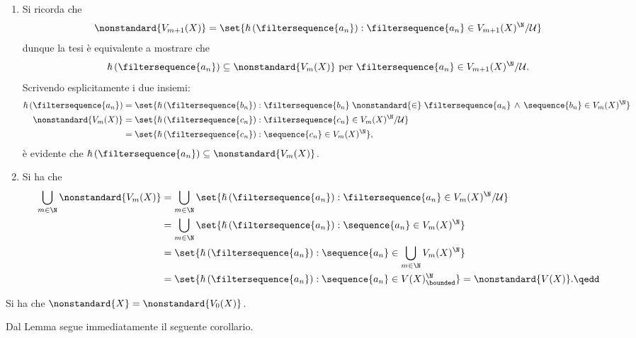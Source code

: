 {\begin{enumerate}
        \item Si ricorda che \begin{equation*}
            \nonstandard{V_{m+1}(X) } = \set{\hslash\left(\filtersequence{a_{n}}\right) : \filtersequence{a_{n}} \in V_{m+1}(X)^{\N}/\mathcal{U} }
        \end{equation*}dunque la tesi è equivalente a mostrare che \[\hslash\left(\filtersequence{a_{n}}\right) \subseteq \nonstandard{V_{m}(X) }\text{ per }\filtersequence{a_{n}} \in V_{m+1}(X)^{\N}/\mathcal{U}.\]Scrivendo esplicitamente i due insiemi:\begin{align*}
            \hslash\left(\filtersequence{a_{n}}\right) &= \set{\hslash \left(\filtersequence{b_{n}}\right): \filtersequence{b_{n}} \mathrel{\nonstandard{\in}}\filtersequence{a_{n}} \,\land\, \sequence{b_{n} } \in V_{m}(X)^{\N} }\\ 
            \nonstandard{V_{m}(X) } &= \set{\hslash\left(\filtersequence{c_{n}}\right): \filtersequence{c_{n}} \in V_{m}(X)^{\N}/\mathcal{U} }\\ 
            &=\set{\hslash\left(\filtersequence{c_{n}}\right): \sequence{c_{n} } \in V_{m}(X)^{\N} },
        \end{align*}è evidente che $ \hslash\left(\filtersequence{a_{n}}\right) \subseteq \nonstandard{V_{m}(X) } $.
        \item Si ha che \begin{align*}
            \bigcup_{m \in \N} \nonstandard{V_{m}(X) } &= \bigcup_{m \in \N} \set{\hslash\left(\filtersequence{a_{n}}\right): \filtersequence{a_{n}} \in V_{m}(X)^{\N}/\mathcal{U} }\\ 
            &=\bigcup_{m \in \N} \set{\hslash\left(\filtersequence{a_{n}}\right): \sequence{a_{n}}\in V_{m}(X)^{\N} }\\ 
            &= \set{\hslash\left(\filtersequence{a_{n}}\right): \sequence{a_{n}}\in \bigcup_{m \in \N} V_{m}(X)^{\N} }\\ 
            &=\set{\hslash\left(\filtersequence{a_{n}}\right): \sequence{a_{n}}\in V(X)^{\N}_{\bounded} } = \nonstandard{V(X)}.\qedd
        \end{align*}
    \end{enumerate}
}

    Si ha che $ \nonstandard{X}= \nonstandard{V_0(X)} $.


Dal Lemma  segue immediatamente il seguente corollario.

